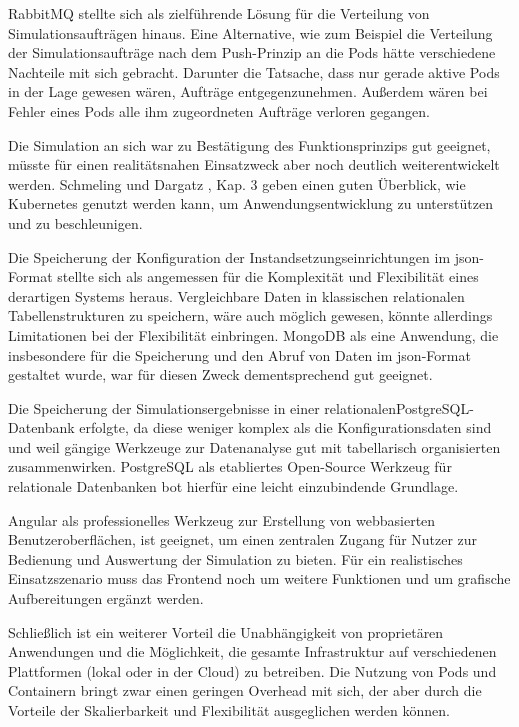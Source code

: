 \documentclass[11pt,a4paper]{article}
\begin{document}
RabbitMQ stellte sich als zielführende Lösung für die Verteilung von Simulationsaufträgen hinaus.
Eine Alternative, wie zum Beispiel die Verteilung der Simulationsaufträge nach dem Push-Prinzip an die Pods
hätte verschiedene Nachteile mit sich gebracht. Darunter die Tatsache, dass nur gerade aktive Pods
in der Lage gewesen wären, Aufträge entgegenzunehmen. Außerdem wären bei Fehler eines Pods alle
ihm zugeordneten Aufträge verloren gegangen.

Die Simulation an sich war zu Bestätigung des Funktionsprinzips gut geeignet,
müsste für einen realitätsnahen Einsatzweck aber noch deutlich weiterentwickelt werden.
Schmeling und Dargatz \cite{Schmeling_Dargatz_2022}, Kap. 3 geben einen guten Überblick,
wie Kubernetes genutzt werden kann, um Anwendungsentwicklung zu unterstützen und zu beschleunigen.

Die Speicherung der Konfiguration der Instandsetzungseinrichtungen im json-Format stellte sich als 
angemessen für die Komplexität und Flexibilität eines derartigen Systems heraus. 
Vergleichbare Daten in klassischen relationalen Tabellenstrukturen zu speichern, wäre auch
möglich gewesen, könnte allerdings Limitationen bei der Flexibilität einbringen.
MongoDB als eine Anwendung, die insbesondere für die Speicherung und den Abruf von
Daten im json-Format gestaltet wurde, war für diesen Zweck dementsprechend gut geeignet.

Die Speicherung der Simulationsergebnisse in einer relationalen\linebreak PostgreSQL-Datenbank
erfolgte, da diese weniger komplex als die Konfigurationsdaten sind und weil
gängige Werkzeuge zur Datenanalyse gut mit tabellarisch organisierten zusammenwirken.
PostgreSQL als etabliertes Open-Source Werkzeug für relationale Datenbanken bot
hierfür eine leicht einzubindende Grundlage.

Angular als professionelles Werkzeug zur Erstellung von webbasierten Benutzeroberflächen,
ist geeignet, um einen zentralen Zugang für Nutzer zur Bedienung und Auswertung der Simulation zu bieten.
Für ein realistisches Einsatzszenario muss das Frontend noch um weitere Funktionen
und um grafische Aufbereitungen ergänzt werden.

Schließlich ist ein weiterer Vorteil die Unabhängigkeit von proprietären Anwendungen und die Möglichkeit, 
die gesamte Infrastruktur auf verschiedenen Plattformen (lokal oder in der Cloud) zu betreiben. 
Die Nutzung von Pods und Containern bringt zwar einen geringen Overhead mit sich,
der aber durch die Vorteile der Skalierbarkeit und Flexibilität ausgeglichen werden können.
\end{document}
